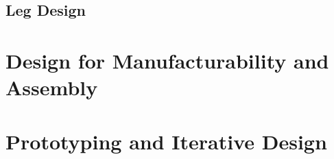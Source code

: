 \subsection{Leg Design}



\section{Design for Manufacturability and Assembly}
\section{Prototyping and Iterative Design}



